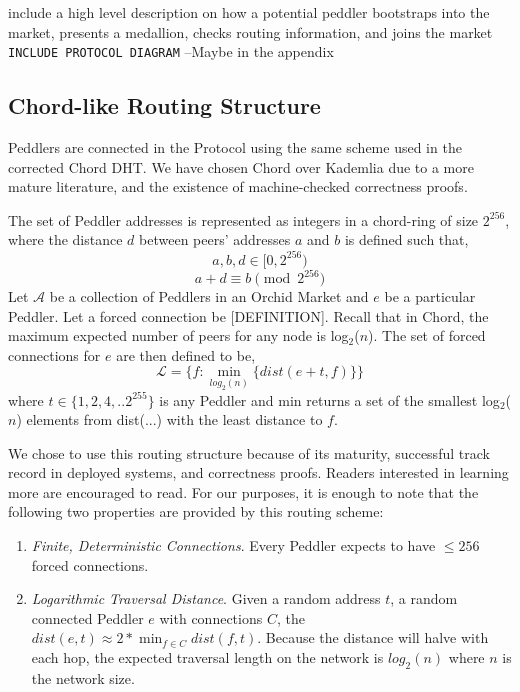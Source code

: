 {\color{red} include a high level description on how a potential peddler bootstraps into the market, presents a medallion, checks routing information, and joins the market}\\
{\color{red} \texttt{INCLUDE PROTOCOL DIAGRAM} --Maybe in the appendix}

\subsection{Chord-like Routing Structure}


Peddlers are connected in the \Orchid{} Protocol using the same scheme used in the corrected Chord DHT. We have chosen Chord over Kademlia due to a more mature literature, and the existence of machine-checked correctness proofs\cite{ChordCorrect}.

The set of Peddler addresses is represented as integers in a chord-ring of size $2^{256}$, where the distance $d$ between peers' addresses $a$ and $b$ is defined such that,
						$$a, b, d \in [0, 2^{256})$$ 
                        $$a + d \equiv b \pmod{2^{256}}$$
Let $\mathcal{A}$ be a collection of Peddlers in an Orchid Market and $e$ be a particular Peddler. Let a forced connection be {\color{red}[DEFINITION]}. Recall that in Chord, the maximum expected number of peers for any node is log$_2$($n$). The set of forced connections for $e$ are then defined to be,
						$$\mathcal{L} = \{f : \min_{log_2(n)} \{dist(e+t, f)\}\}$$ 
where $t \in \{1, 2, 4,.. 2^{255}\}$ is any Peddler and min returns a set of the smallest log$_2$($n$) elements from dist(...) with the least distance to $f$.

We chose to use this routing structure because of its maturity, successful track record in deployed systems, and correctness proofs. Readers interested in learning more are encouraged to read\cite{CHORD}. For our purposes, it is enough to note that the
following two properties are provided by this routing scheme:

\begin{enumerate}
\item \emph{Finite, Deterministic Connections}. Every Peddler expects to have $\leq 256$ forced connections.
\item \emph{Logarithmic Traversal Distance}. Given a random address $t$, a random connected Peddler $e$ with connections $C$, the $dist(e, t) \approx 2 * \min_{f \in C} dist(f, t)$. Because the distance will halve with each hop, the expected traversal length on the network is $log_2(n)$ where $n$ is the network size.
\end{enumerate}


